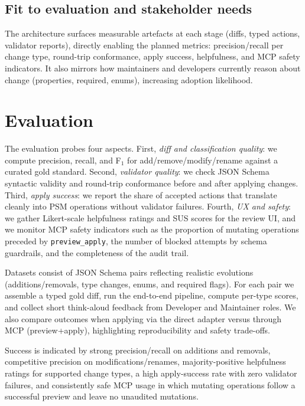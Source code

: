 \subsection*{Fit to evaluation and stakeholder needs}
The architecture surfaces measurable artefacts at each stage (diffs, typed actions, validator reports), directly enabling the planned metrics: precision/recall per change type, round-trip conformance, apply success, helpfulness, and MCP safety indicators. It also mirrors how maintainers and developers currently reason about change (properties, required, enums), increasing adoption likelihood.

\section{Evaluation}
The evaluation probes four aspects. First, \textit{diff and classification quality}: we compute precision, recall, and F$_1$ for add/remove/modify/rename against a curated gold standard. Second, \textit{validator quality}: we check JSON Schema syntactic validity and round-trip conformance before and after applying changes. Third, \textit{apply success}: we report the share of accepted actions that translate cleanly into PSM operations without validator failures. Fourth, \textit{UX and safety}: we gather Likert-scale helpfulness ratings and SUS scores for the review UI, and we monitor MCP safety indicators such as the proportion of mutating operations preceded by \texttt{preview\_apply}, the number of blocked attempts by schema guardrails, and the completeness of the audit trail.

Datasets consist of JSON Schema pairs reflecting realistic evolutions (additions/removals, type changes, enums, and required flags). For each pair we assemble a typed gold diff, run the end-to-end pipeline, compute per-type scores, and collect short think-aloud feedback from Developer and Maintainer roles. We also compare outcomes when applying via the direct adapter versus through MCP (preview+apply), highlighting reproducibility and safety trade-offs.

Success is indicated by strong precision/recall on additions and removals, competitive precision on modifications/renames, majority-positive helpfulness ratings for supported change types, a high apply-success rate with zero validator failures, and consistently safe MCP usage in which mutating operations follow a successful preview and leave no unaudited mutations.

